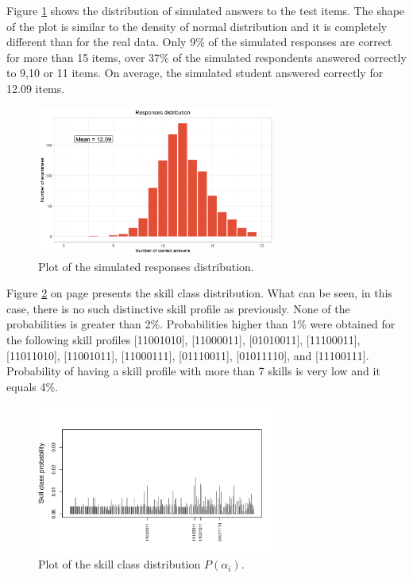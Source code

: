 \documentclass[english]{pwr_wmat_praca_dyplomowa}
\theoremstyle{plain}
\numberwithin{theorem}{chapter}
\theoremstyle{definition}
\numberwithin{theorem}{chapter}
\begin{document}
	Figure \ref{histogram_ans_sim} shows the distribution of simulated answers to the test items. The shape of the plot is similar to the density of normal distribution and it is completely different than for the real data. Only 9\% of the simulated responses are correct for more than 15 items, over 37\% of the simulated respondents answered correctly to 9,10 or 11 items. On average, the simulated student answered correctly for 12.09 items.
	
	\begin{figure}[h!]
		\centering
		\includegraphics[width=0.7\textwidth]{Responses_sim_distribution.png}
		\caption{Plot of the simulated responses distribution.}
		\label{histogram_ans_sim}
	\end{figure}
	
	Figure \ref{skill_class_dist_sim} on page \pageref{skill_class_dist_sim} presents the skill class distribution. What can be seen, in this case, there is no such distinctive skill profile as previously. None of the probabilities is greater than 2\%. Probabilities higher than 1\% were obtained for the following skill profiles [11001010], [11000011], [01010011], [11100011], [11011010], [11001011], [11000111], [01110011], [01011110], and [11100111]. Probability of having a skill profile with more than 7 skills is very low and it equals 4\%.
	
	\begin{figure}[h!]
		\centering
		\includegraphics[width=0.7\textwidth]{Skill_class_probability_sim.pdf}
		\caption{Plot of the skill class distribution $P(\alpha_i)$.}
		\label{skill_class_dist_sim}
	\end{figure}
	
\end{document}
